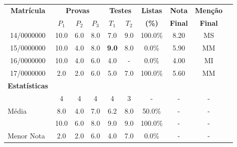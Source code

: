 \begin{longtable}{cccccccccc}
\toprule
\multirow{2}{*}{\textbf{Matrícula}} & \multicolumn{3}{c}{\textbf{Provas}} & \multicolumn{2}{c}{\textbf{Testes}} & \textbf{Listas} & \textbf{Nota} & \textbf{Menção} \\
 & \textbf{$P_1$} & \textbf{$P_2$} & \textbf{$P_3$} & \textbf{$T_1$} & \textbf{$T_2$} & \textbf{(\%)} & \textbf{Final} & \textbf{Final} \\
\toprule
\rowcolor[gray]{.9}
14/0000000 & 10.0 & 6.0 & 8.0 & 7.0 & 9.0 & 100.0\% & 8.20 & MS \\
15/0000000 & 10.0 & 4.0 & 8.0 & \textbf{9.0} & 8.0 & 0.0\% & 5.90 & MM \\
\rowcolor[gray]{.9}
16/0000000 & 10.0 & 4.0 & 6.0 & 4.0 & - & 0.0\% & 4.00 & MI \\
17/0000000 & 2.0 & 2.0 & 6.0 & 5.0 & 7.0 & 100.0\% & 5.60 & MM \\
\toprule
\textbf{Estatísticas} & \multicolumn{9}{c}{} \\
\toprule
\rowcolor[gray]{.9}
\multicolumn{1}{l}{Presentes} & 4 & 4 & 4 & 4 & 3 & - & - & - \\
\multicolumn{1}{l}{Média} & 8.0 & 4.0 & 7.0 & 6.2 & 8.0 & 50.0\% & - & - \\
\rowcolor[gray]{.9}
\multicolumn{1}{l}{Maior Nota} & 10.0 & 6.0 & 8.0 & 9.0 & 9.0 & 100.0\% & - & - \\
\multicolumn{1}{l}{Menor Nota} & 2.0 & 2.0 & 6.0 & 4.0 & 7.0 & 0.0\% & - & - \\
\bottomrule
\end{longtable}
